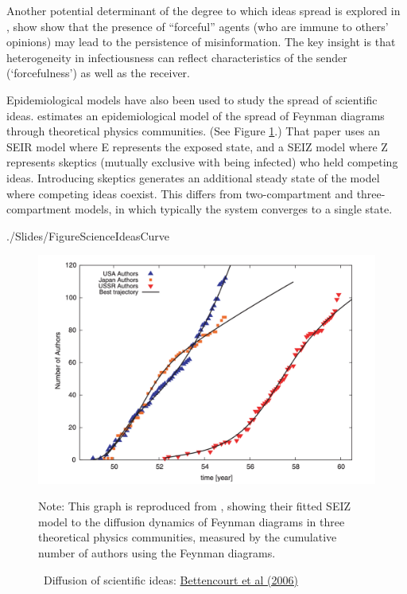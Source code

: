 Another potential determinant of the degree to which ideas spread is explored in \href{https://www.kdd.org/exploration_files/8._CR.10.Misinformation_in_social_media_-_Final.pdf}{\cite{acemoglu2010spread}}, show show that the presence of ``forceful'' agents (who are immune to others' opinions) may lead to the persistence of misinformation. The key insight is that heterogeneity in infectiousness can reflect characteristics of the sender (`forcefulness') as well as the receiver.

Epidemiological models have also been used to study the spread of scientific ideas.   \href{https://github.com/iworld1991/EpiExp/blob/master/Literature/bettencourt2006power.pdf}{\cite{bettencourt2006power}} estimates an epidemiological model of the spread of Feynman diagrams through theoretical physics communities. (See Figure \ref{fig:science_ideas_curve}.) That paper uses an SEIR model where E represents the exposed state, and a SEIZ model where Z represents skeptics (mutually exclusive with being infected) who held competing ideas. Introducing skeptics generates an additional steady state of the model where competing ideas coexist. This differs from two-compartment and three-compartment models, in which typically the system converges to a single state.


\begin{verbatimwrite}{./Slides/FigureScienceIdeasCurve}
	\begin{figure}[!ht] \centering  %
		\caption{ ~Diffusion of scientific ideas: \href{http://web.mit.edu/dikaiser/www/BAKC.PhysA.pdf}{Bettencourt et al (2006)}}\nocite{bettencourt2006power}
		\label{fig:science_ideas_curve}
		\centerline{\includegraphics[width=\textwidth]{./figures/Feynman}}
		\begin{flushleft}{\footnotesize Note: This graph is reproduced from \cite{bettencourt2006power}, showing their fitted SEIZ model to the diffusion dynamics of Feynman diagrams in three theoretical physics communities, measured by the cumulative number of authors using the Feynman diagrams.}
		\end{flushleft}
	\end{figure}
\end{verbatimwrite}%

